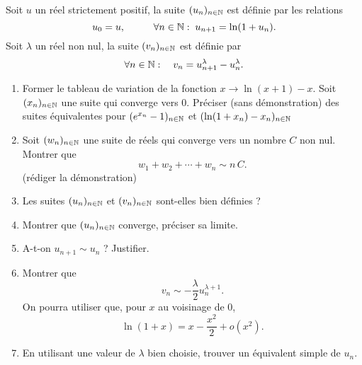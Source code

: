 Soit $u$ un r{\'e}el strictement positif, la suite $(u_n)_{n\in\mathbb{N}}$ est d{\'e}finie par les relations
\begin{displaymath}
u_0 =u, \hspace{1cm}
\forall n \in \mathbb{N}: \; u_{n+1}=\ln (1+u_n).
\end{displaymath}
Soit $\lambda $ un r{\'e}el non nul, la suite $(v_n)_{n\in \mathbb{N}}$ est d{\'e}finie par
\[
\forall n\in \mathbb{N} : \quad v_n=u_{n+1}^\lambda -u_n^\lambda.
\]

\begin{enumerate}
\item Former le tableau de variation de la fonction $x\rightarrow \ln (x+1) -x$.\newline
Soit $(x_n)_{n\in \mathbb{N}}$ une suite qui converge vers 0. Préciser (sans démonstration) des suites équivalentes pour $(e^{x_n}-1)_{n\in \mathbb{N}}$ et $(\ln (1+x_n)-x_n)_{n\in \mathbb{N}}$
\item  Soit $(w_{n})_{n\in \mathbb{N}}$ une suite de r{\'e}els qui converge vers un nombre $C$ non nul. Montrer que
\[
w_{1}+w_{2}+\cdots +w_{n}\sim n\,C .
\]
(r{\'e}diger la d{\'e}monstration)

\item  Les suites $(u_{n})_{n\in \mathbb{N}}$ et $(v_{n})_{n\in \mathbb{N}}$
sont-elles bien d{\'e}finies ?

\item  Montrer que $(u_{n})_{n\in \mathbb{N}}$ converge, pr{\'e}ciser sa limite.

\item  A-t-on $u_{n+1}\sim u_{n}$ ? Justifier.

\item  Montrer que
\[
v_{n}\sim -\frac{\lambda }{2}u_{n}^{\lambda +1}.
\]
On pourra utiliser que, pour $x$ au voisinage de $0$,
\begin{displaymath}
 \ln(1+x) = x -\frac{x^2}{2} +o(x^2).
\end{displaymath}

\item  En utilisant une valeur de $\lambda $ bien choisie, trouver un {\'e}quivalent simple de $u_{n}$.
\end{enumerate}
